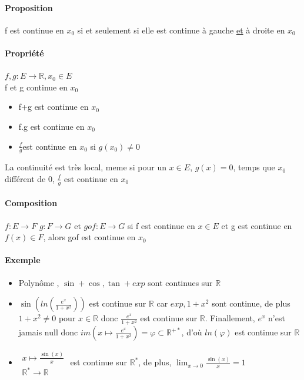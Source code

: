 \paragraph{Proposition} f est continue en $x_0$ si et seulement si elle est continue à gauche \ul{et} à droite en $x_0$
\paragraph{Propriété} $f, g : E \rightarrow \mathbb{R}, x_0 \in E$ ~\\
f et g continue en $x_0$ 

\begin{itemize}
	\item f+g est continue en $x_0$
	\item f.g est continue en $x_0$
	\item $\frac{f}{g} $est continue en $x_0$ si $g(x_0) \neq 0$
\end{itemize}
La continuité est très local, meme si pour un $x \in E$, $g(x) = 0$, temps que $x_0$ différent de 0, $\frac{f}{g}$ est continue en $x_0$

\paragraph{Composition} $f:E \rightarrow F$ $g:F \rightarrow G$ et $gof : E \rightarrow G$
si f est continue en $x \in E$ et g est continue en $f(x) \in F$, alors gof est continue en $x_0$

\paragraph{Exemple} \begin{itemize}
	\item Polynôme , $\sin+\cos, \tan + exp$ sont continues sur $\mathbb{R}$
	\item $\sin(ln(\frac{e^x}{1+x^2}))$ est continue sur $\mathbb{R}$ car $exp, 1+x^2$ sont continue, de plus $1+x^2 \neq 0$ pour $x \in \mathbb{R}$ donc $\frac{e^x}{1+x^2}$ est continue sur $\mathbb{R}$.
	Finallement, $e^x$ n'est jamais null donc $im(x\mapsto \frac{e^x}{1+x^2}) = \varphi \subset \mathbb{R}^{+*}$, d'où $ln(\varphi)$ est continue sur $\mathbb{R}$

\item $\begin{array}{l}
	x\mapsto \frac{\sin(x)}{x} \\
	\mathbb{R^*} \rightarrow \mathbb{R}
\end{array}$
	 est continue sur $\mathbb{R}^*$, de plus, $\lim_{x \to 0} \frac{\sin(x)}{x} = 1$ 
\end{itemize}

